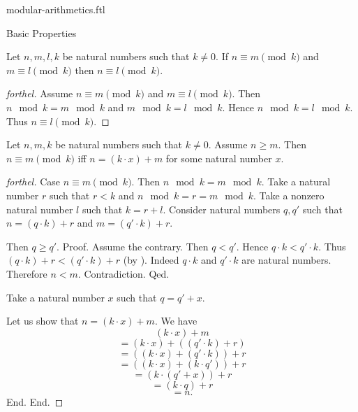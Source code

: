 \documentclass{naproche-library}
\begin{document}
\begin{smodule}[title=Modular Arithmetics]{modular-arithmetics.ftl}
\begin{sfragment}{Basic Properties}
  \begin{proposition}[forthel,id=ARITHMETIC_08_7464329746055168]
    Let $n, m, l, k$ be natural numbers such that $k \neq 0$.
    If $n \equiv m \pmod{k}$ and $m \equiv l \pmod{k}$ then $n \equiv l \pmod{k}$.
  \end{proposition}
  \begin{proof}[forthel]
    Assume $n \equiv m \pmod{k}$ and $m \equiv l \pmod{k}$.
    Then $n \mod k = m \mod k$ and $m \mod k = l \mod k$.
    Hence $n \mod k = l \mod k$.
    Thus $n \equiv l \pmod{k}$.
  \end{proof}

  \begin{proposition}[forthel,id=ARITHMETIC_08_2034122983735296]
    Let $n, m, k$ be natural numbers such that $k \neq 0$.
    Assume $n \geq m$.
    Then $n \equiv m \pmod{k}$ iff $n = (k \cdot x) + m$ for some natural number $x$.
  \end{proposition}
  \begin{proof}[forthel]
    Case $n \equiv m \pmod{k}$.
      Then $n \mod k = m \mod k$.
      Take a natural number $r$ such that $r < k$ and $n \mod k = r = m \mod k$.
      Take a nonzero natural number $l$ such that $k = r + l$.
      Consider natural numbers $q,q'$ such that $n = (q \cdot k) + r$ and $m = (q' \cdot k) + r$.

      Then $q \geq q'$. \newline
      Proof.
        Assume the contrary.
        Then $q < q'$.
        Hence $q \cdot k < q' \cdot k$.
        Thus $(q \cdot k) + r < (q' \cdot k) + r$ (by ).
        Indeed $q \cdot k$ and $q' \cdot k$ are natural numbers.
        Therefore $n < m$.
        Contradiction.
      Qed.

      Take a natural number $x$ such that $q = q' + x$.

      Let us show that $n = (k \cdot x) + m$.
        We have
        \[  (k \cdot x) + m                       \]
        \[    = (k \cdot x) + ((q' \cdot k) + r)  \]
        \[    = ((k \cdot x) + (q' \cdot k)) + r  \]
        \[    = ((k \cdot x) + (k \cdot q')) + r  \]
        \[    = (k \cdot (q' + x)) + r            \]
        \[    = (k \cdot q) + r                   \]
        \[    = n.                                \]
      End.
    End.


\end{proof}
\end{sfragment}
\end{smodule}
\end{document}
